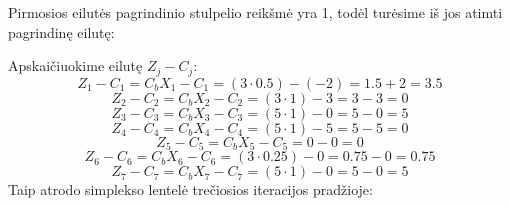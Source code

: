 \documentclass{article}
\begin{document}
Pirmosios eilutės pagrindinio stulpelio reikšmė yra 1, todėl turėsime iš jos atimti pagrindinę eilutę:
\begin{table}[H]
    \centering
\end{table}
Apskaičiuokime eilutę $Z_j-C_j$:
\begin{equation*}
    Z_1-C_1=C_bX_1-C_1=(3\cdot0.5)-(-2)=1.5+2=3.5
\end{equation*}
\begin{equation*}
    Z_2-C_2=C_bX_2-C_2=(3\cdot1)-3=3-3=0
\end{equation*}
\begin{equation*}
    Z_3-C_3=C_bX_3-C_3=(5\cdot1)-0=5-0=5
\end{equation*}
\begin{equation*}
    Z_4-C_4=C_bX_4-C_4=(5\cdot1)-5=5-5=0
\end{equation*}
\begin{equation*}
    Z_5-C_5=C_bX_5-C_5=0-0=0
\end{equation*}
\begin{equation*}
    Z_6-C_6=C_bX_6-C_6=(3\cdot0.25)-0=0.75-0=0.75
\end{equation*}
\begin{equation*}
    Z_7-C_7=C_bX_7-C_7=(5\cdot1)-0=5-0=5
\end{equation*}
Taip atrodo simplekso lentelė trečiosios iteracijos pradžioje:
\end{document}
